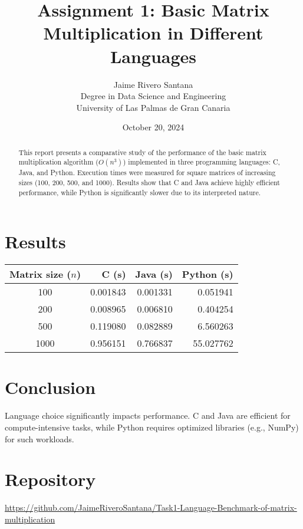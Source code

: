 \documentclass[12pt]{article}
\title{Assignment 1: Basic Matrix Multiplication in Different Languages}
\author{Jaime Rivero Santana \\ Degree in Data Science and Engineering \\ University of Las Palmas de Gran Canaria}
\date{October 20, 2024}
\begin{document}
\maketitle

\begin{abstract}
This report presents a comparative study of the performance of the basic matrix multiplication algorithm ($O(n^3)$) implemented in three programming languages: C, Java, and Python. Execution times were measured for square matrices of increasing sizes (100, 200, 500, and 1000). Results show that C and Java achieve highly efficient performance, while Python is significantly slower due to its interpreted nature.
\end{abstract}

\section{Results}
\begin{center}
\begin{tabular}{crrr}
\toprule
Matrix size ($n$) & C (s) & Java (s) & Python (s) \\
\midrule
100 & 0.001843 & 0.001331 & 0.051941 \\
200 & 0.008965 & 0.006810 & 0.404254 \\
500 & 0.119080 & 0.082889 & 6.560263 \\
1000 & 0.956151 & 0.766837 & 55.027762 \\
\bottomrule
\end{tabular}
\end{center}

\section{Conclusion}
Language choice significantly impacts performance. C and Java are efficient for compute-intensive tasks, while Python requires optimized libraries (e.g., NumPy) for such workloads.

\section*{Repository}
\url{https://github.com/JaimeRiveroSantana/Task1-Language-Benchmark-of-matrix-multiplication}
\end{document}
